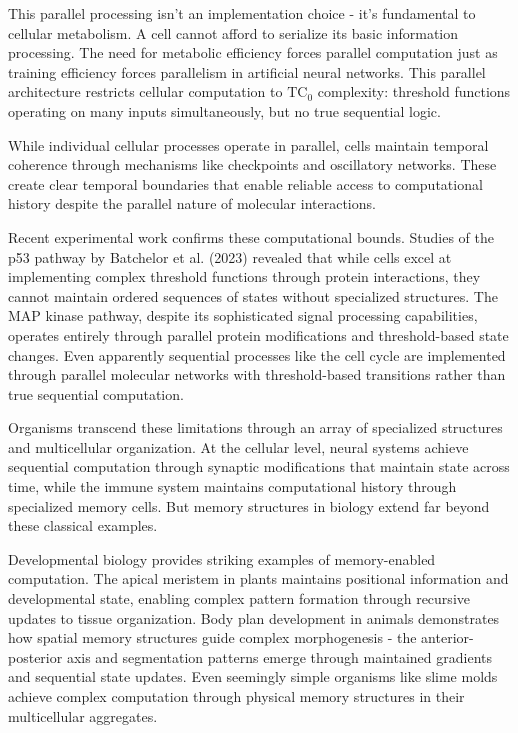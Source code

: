 \documentclass[12pt]{article}
\begin{document}
This parallel processing isn't an implementation choice - it's fundamental to cellular metabolism. A cell cannot afford to serialize its basic information processing. The need for metabolic efficiency forces parallel computation just as training efficiency forces parallelism in artificial neural networks. This parallel architecture restricts cellular computation to $\text{TC}_0$ complexity: threshold functions operating on many inputs simultaneously, but no true sequential logic.

While individual cellular processes operate in parallel, cells maintain temporal coherence through mechanisms like checkpoints and oscillatory networks. These create clear temporal boundaries that enable reliable access to computational history despite the parallel nature of molecular interactions.

Recent experimental work confirms these computational bounds. Studies of the p53 pathway by Batchelor et al. (2023) revealed that while cells excel at implementing complex threshold functions through protein interactions, they cannot maintain ordered sequences of states without specialized structures. The MAP kinase pathway, despite its sophisticated signal processing capabilities, operates entirely through parallel protein modifications and threshold-based state changes. Even apparently sequential processes like the cell cycle are implemented through parallel molecular networks with threshold-based transitions rather than true sequential computation.

Organisms transcend these limitations through an array of specialized structures and multicellular organization. At the cellular level, neural systems achieve sequential computation through synaptic modifications that maintain state across time, while the immune system maintains computational history through specialized memory cells. But memory structures in biology extend far beyond these classical examples.

Developmental biology provides striking examples of memory-enabled computation. The apical meristem in plants maintains positional information and developmental state, enabling complex pattern formation through recursive updates to tissue organization. Body plan development in animals demonstrates how spatial memory structures guide complex morphogenesis - the anterior-posterior axis and segmentation patterns emerge through maintained gradients and sequential state updates. Even seemingly simple organisms like slime molds achieve complex computation through physical memory structures in their multicellular aggregates.
\end{document}
